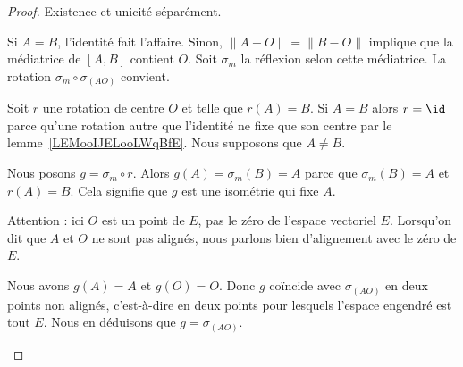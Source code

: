 \begin{proof}
	Existence et unicité séparément.
	\begin{subproof}
		\spitem[Existence]
		Si \( A=B\), l'identité fait l'affaire. Sinon, \( \| A-O \|=\| B-O \|\) implique que la médiatrice de \( [A,B]\) contient \( O\). Soit \( \sigma_m\) la réflexion selon cette médiatrice. La rotation \( \sigma_m\circ\sigma_{(AO)}\) convient.

		\spitem[Unicité]
		Soit \( r\) une rotation de centre \( O\) et telle que \( r(A)=B\). Si \( A=B\) alors \( r=\id\) parce qu'une rotation autre que l'identité ne fixe que son centre par le lemme~\ref{LEMooIJELooLWqBfE}. Nous supposons que \( A\neq B\).

		Nous posons \( g=\sigma_m\circ r\). Alors \( g(A)=\sigma_m(B)=A\) parce que \( \sigma_m(B)=A\) et \( r(A)=B\). Cela signifie que \( g\) est une isométrie qui fixe \( A\).

		\begin{subproof}
			Attention : ici \( O\) est un point de \( E\), pas le zéro de l'espace vectoriel \( E\). Lorsqu'on dit que \( A\) et \( O\) ne sont pas alignés, nous parlons bien d'alignement avec le zéro de \( E\).

			Nous avons \( g(A)=A\) et \( g(O)=O\). Donc \( g\) coïncide avec \( \sigma_{(AO)}\) en deux points non alignés, c'est-à-dire en deux points pour lesquels l'espace engendré est tout \( E\). Nous en déduisons que \( g=\sigma_{(AO)}\).


\end{subproof}
\end{subproof}
\end{proof}
